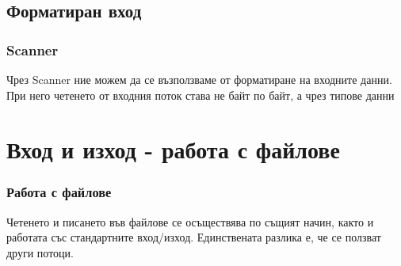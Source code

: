 \documentclass{beamer}
\begin{document}
  \subsection{Форматиран вход}

  \begin{frame}
    \frametitle{Scanner}
    Чрез Scanner ние можем да се възползваме от форматиране на входните данни. При него четенето от входния поток става не байт по байт, а чрез типове данни
  \end{frame}

  \section{Вход и изход - работа с файлове}

  \begin{frame}
    \frametitle{Работа с файлове}
    Четенето и писането във файлове се осъществява по същият начин, както и работата със стандартните вход/изход. Единствената разлика е, че се ползват други потоци.
  \end{frame}
\end{document}
